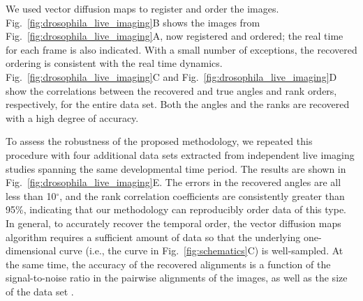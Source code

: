 \documentclass[twocolumn, 10pt]{article}
\newcommand{\fig}[0]{Fig.}
\begin{document}
We used vector diffusion maps to register and order the images.
%
\fig~\ref{fig:drosophila_live_imaging}B shows the images from \fig~\ref{fig:drosophila_live_imaging}A, now registered and ordered; the real time for each frame is also indicated.
%
With a small number of exceptions, the recovered ordering is consistent with the real time dynamics.
%
\fig~\ref{fig:drosophila_live_imaging}C and \fig~\ref{fig:drosophila_live_imaging}D  show the correlations between the recovered and true angles and rank orders, respectively, for the entire data set.
%
Both the angles and the ranks are recovered with a high degree of accuracy.

To assess the robustness of the proposed methodology, we repeated this procedure with four additional data sets extracted from independent live imaging studies spanning the same developmental time period.
%
The results are shown in \fig~\ref{fig:drosophila_live_imaging}E.
%
The errors in the recovered angles are all less than 10$^\circ$, and the rank correlation coefficients are consistently greater than 95\%, indicating that our methodology can reproducibly order data of this type.
%
In general, to accurately recover the temporal order, the vector diffusion maps algorithm requires a sufficient amount of data so that the underlying one-dimensional curve (i.e., the curve in \fig~\ref{fig:schematics}C) is well-sampled.
%
At the same time, the accuracy of the recovered alignments is a function of the signal-to-noise ratio in the pairwise alignments of the images, as well as the size of the data set \citep{singer2011angular}.
%
%
\end{document}
